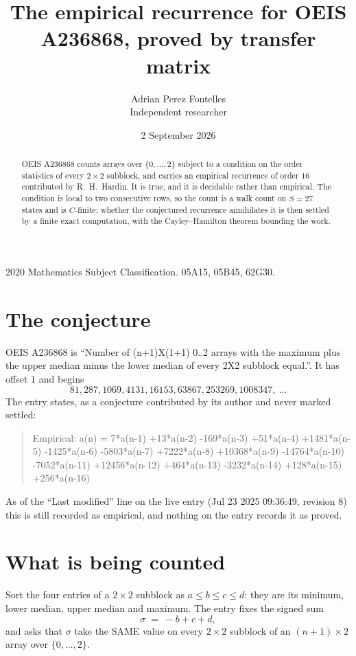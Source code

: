 \documentclass[11pt,a4paper]{article}
\title{The empirical recurrence for OEIS A236868, proved by transfer matrix}
\author{Adrian Perez Fontelles\\ \small Independent researcher}
\date{2 September 2026}
\theoremstyle{plain}
\theoremstyle{definition}
\begin{document}
\maketitle

\begin{abstract}
OEIS A236868 counts arrays over $\{0,\dots,2\}$ subject to a condition on the order
statistics of every $2\times2$ subblock, and carries an empirical recurrence of order
$16$ contributed by R.~H.~Hardin. It is true, and it is decidable rather than empirical.
The condition is local to two consecutive rows, so the count is a walk count on $S=27$
states and is $C$-finite; whether the conjectured recurrence annihilates it is then settled by
a finite exact computation, with the Cayley--Hamilton theorem bounding the work.
\end{abstract}

\noindent\small 2020 Mathematics Subject Classification. 05A15, 05B45, 62G30.\normalsize

\section{The conjecture}

OEIS A236868 is ``Number of (n+1)X(1+1) 0..2 arrays with the maximum plus the upper median minus the lower median of every 2X2 subblock equal.''. It has offset $1$ and begins
\[
81, 287, 1069, 4131, 16153, 63867, 253269, 1008347,\ \dots
\]
The entry states, as a conjecture contributed by its author and never marked settled:
\begin{quote}
Empirical: a(n) = 7*a(n-1) +13*a(n-2) -169*a(n-3) +51*a(n-4) +1481*a(n-5) -1425*a(n-6) -5803*a(n-7) +7222*a(n-8) +10368*a(n-9) -14764*a(n-10) -7052*a(n-11) +12456*a(n-12) +464*a(n-13) -3232*a(n-14) +128*a(n-15) +256*a(n-16)
\end{quote}
As of the ``Last modified'' line on the live entry (Jul 23 2025 09:36:49, revision 8) this is still
recorded as empirical, and nothing on the entry records it as proved.

\section{What is being counted}

Sort the four entries of a $2\times2$ subblock as $a\le b\le c\le d$: they
are its minimum, lower median, upper median and maximum. The entry fixes the signed sum
\[
\sigma\;=\;-b+c+d,
\]
and asks that $\sigma$ take the SAME value on every $2\times2$ subblock of an
$(n+1)\times2$ array over $\{0,\dots,2\}$.
\end{document}
